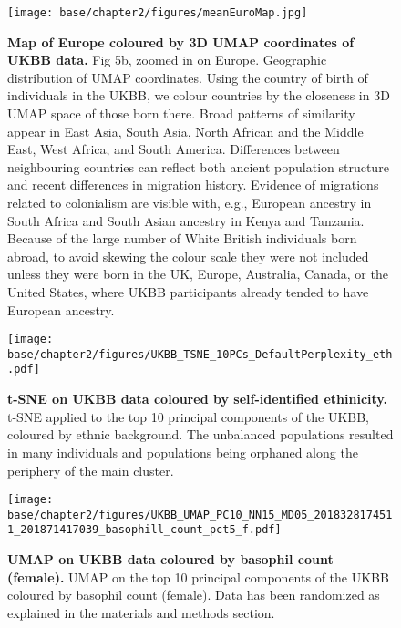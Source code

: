 \newpage

\begin{figure}[ht]
    \centering
    \texttt{[image: base/chapter2/figures/meanEuroMap.jpg]}
    \caption[Map of Europe coloured by 3D UMAP coordinates of UKBB data]{\textbf{Map of Europe coloured by 3D UMAP coordinates of UKBB data.} Fig 5b, zoomed in on Europe. Geographic distribution of UMAP coordinates. Using the country of birth of individuals in the UKBB, we colour countries by the closeness in 3D UMAP space of those born there. Broad patterns of similarity appear in East Asia, South Asia, North African and the Middle East, West Africa, and South America. Differences between neighbouring countries can reflect both ancient population structure and recent differences in migration history. Evidence of migrations related to colonialism are visible with, e.g., European ancestry in South Africa and South Asian ancestry in Kenya and Tanzania. Because of the large number of White British individuals born abroad, to avoid skewing the colour scale they were not included unless they were born in the UK, Europe, Australia, Canada, or the United States, where UKBB participants already tended to have European ancestry.}
    \label{fig:supp_umap_ukbb_eur}
\end{figure}

\newpage

\begin{figure}[!htb]
    \centering
    \texttt{[image: base/chapter2/figures/UKBB\_TSNE\_10PCs\_DefaultPerplexity\_eth.pdf]}
    \caption[t-SNE on UKBB data coloured by self-identified ethinicity]{\textbf{t-SNE on UKBB data coloured by self-identified ethinicity.} t-SNE applied to the top 10 principal components of the UKBB, coloured by ethnic background. The unbalanced populations resulted in many individuals and populations being orphaned along the periphery of the main cluster.}
    \label{fig:supp_ukbb_tsne}
\end{figure}

\begin{figure}[ht]
    \centering
    \texttt{[image: base/chapter2/figures/UKBB\_UMAP\_PC10\_NN15\_MD05\_2018328174511\_201871417039\_basophill\_count\_pct5\_f.pdf]}
    \caption[UMAP on UKBB data coloured by basophil count (female)]{\textbf{UMAP on UKBB data coloured by basophil count (female).} UMAP on the top 10 principal components of the UKBB coloured by basophil count (female). Data has been randomized as explained in the materials and methods section.}
    \label{fig:supp_ukbb_basophill_f}
\end{figure}

